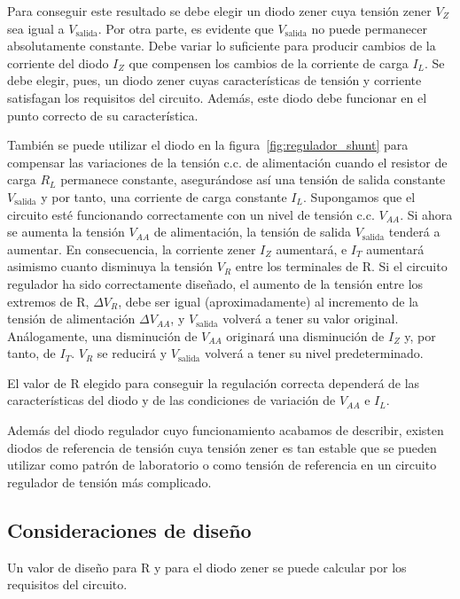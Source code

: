 \documentclass[12pt,a4paper]{article}
\begin{document}
Para conseguir este resultado se debe elegir un diodo zener cuya tensión zener $V_Z$ sea igual a $V_{\text{salida}}$. Por otra parte, es evidente que $V_{\text{salida}}$ no puede permanecer absolutamente constante. Debe variar lo suficiente para producir cambios de la corriente del diodo $I_Z$ que compensen los cambios de la corriente de carga $I_L$. Se debe elegir, pues, un diodo zener cuyas características de tensión y corriente satisfagan los requisitos del circuito. Además, este diodo debe funcionar en el punto correcto de su característica.

También se puede utilizar el diodo en la figura~\ref{fig:regulador_shunt} para compensar las variaciones de la tensión c.c. de alimentación cuando el resistor de carga $R_L$ permanece constante, asegurándose así una tensión de salida constante $V_{\text{salida}}$ y por tanto, una corriente de carga constante $I_L$. Supongamos que el circuito esté funcionando correctamente con un nivel de tensión c.c. $V_{AA}$. Si ahora se aumenta la tensión $V_{AA}$ de alimentación, la tensión de salida $V_{\text{salida}}$ tenderá a aumentar. En consecuencia, la corriente zener $I_Z$ aumentará, e $I_T$ aumentará asimismo cuanto disminuya la tensión $V_R$ entre los terminales de R. Si el circuito regulador ha sido correctamente diseñado, el aumento de la tensión entre los extremos de R, $\Delta V_R$, debe ser igual (aproximadamente) al incremento de la tensión de alimentación $\Delta V_{AA}$, y $V_{\text{salida}}$ volverá a tener su valor original. Análogamente, una disminución de $V_{AA}$ originará una disminución de $I_Z$ y, por tanto, de $I_T$. $V_R$ se reducirá y $V_{\text{salida}}$ volverá a tener su nivel predeterminado.

El valor de R elegido para conseguir la regulación correcta dependerá de las características del diodo y de las condiciones de variación de $V_{AA}$ e $I_L$.

Además del diodo regulador cuyo funcionamiento acabamos de describir, existen diodos de referencia de tensión cuya tensión zener es tan estable que se pueden utilizar como patrón de laboratorio o como tensión de referencia en un circuito regulador de tensión más complicado.

\subsection*{Consideraciones de diseño}
Un valor de diseño para R y para el diodo zener se puede calcular por los requisitos del circuito.
\end{document}

